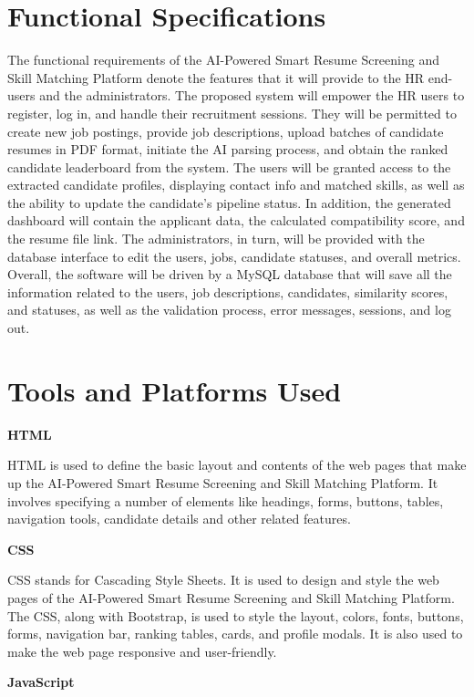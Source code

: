 \documentclass[12pt,a4paper]{report}
\begin{document}
\section{Functional Specifications}


The functional requirements of the AI-Powered Smart Resume Screening and Skill Matching Platform denote the features that it will provide to the HR end-users and the administrators. The proposed system will empower the HR users to register, log in, and handle their recruitment sessions. They will be permitted to create new job postings, provide job descriptions, upload batches of candidate resumes in PDF format, initiate the AI parsing process, and obtain the ranked candidate leaderboard from the system. The users will be granted access to the extracted candidate profiles, displaying contact info and matched skills, as well as the ability to update the candidate's pipeline status. In addition, the generated dashboard will contain the applicant data, the calculated compatibility score, and the resume file link. The administrators, in turn, will be provided with the database interface to edit the users, jobs, candidate statuses, and overall metrics. Overall, the software will be driven by a MySQL database that will save all the information related to the users, job descriptions, candidates, similarity scores, and statuses, as well as the validation process, error messages, sessions, and log out.

\section{Tools and Platforms Used}

\textbf{HTML}

HTML is used to define the basic layout and contents of the web pages that make up the AI-Powered Smart Resume Screening and Skill Matching Platform. It involves specifying a number of elements like headings, forms, buttons, tables, navigation tools, candidate details and other related features.

\textbf{CSS}

CSS stands for Cascading Style Sheets. It is used to design and style the web pages of the AI-Powered Smart Resume Screening and Skill Matching Platform. The CSS, along with Bootstrap, is used to style the layout, colors, fonts, buttons, forms, navigation bar, ranking tables, cards, and profile modals. It is also used to make the web page responsive and user-friendly.

\textbf{JavaScript}
\end{document}
